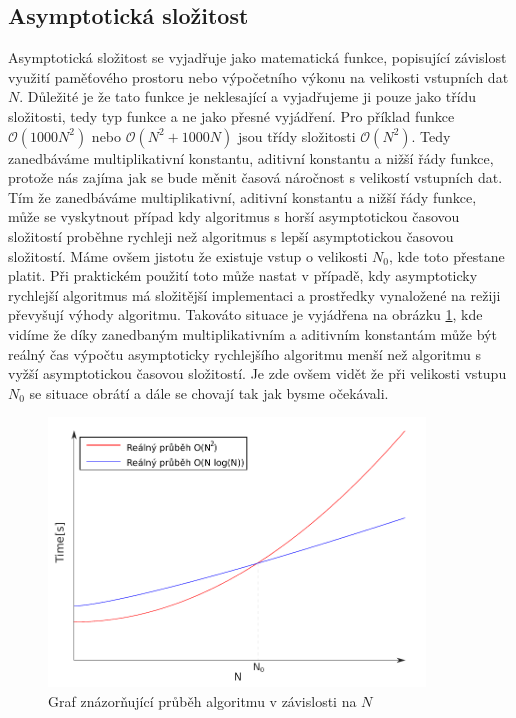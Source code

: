 \subsection{Asymptotická složitost}
	Asymptotická složitost se vyjadřuje jako matematická funkce, popisující závislost využití paměťového prostoru nebo výpočetního výkonu na velikosti vstupních dat $N$. Důležité je že tato funkce je neklesající a vyjadřujeme ji pouze jako třídu složitosti, tedy typ funkce a ne jako přesné vyjádření. Pro příklad funkce $\mathcal{O} (1000N^2) $ nebo $\mathcal{O} (N^2 + 1000N)$ jsou třídy složitosti $\mathcal{O} (N^2)$. Tedy zanedbáváme multiplikativní konstantu, aditivní konstantu a nižší řády funkce, protože nás zajíma jak se bude měnit časová náročnost s velikostí vstupních dat.
	Tím že zanedbáváme multiplikativní, aditivní konstantu a nižší řády funkce, může se vyskytnout případ kdy algoritmus s horší asymptotickou časovou složitostí proběhne rychleji než algoritmus s lepší asymptotickou časovou složitostí. Máme ovšem jistotu že existuje vstup o velikosti $N_0$, kde toto přestane platit. Při praktickém použití toto může nastat v případě, kdy asymptoticky rychlejší algoritmus má složitější implementaci a prostředky vynaložené na režiji převyšují výhody algoritmu. Takováto situace je vyjádřena na obrázku \ref{fig:4-time_complexity}, kde vidíme že díky zanedbaným multiplikativním a aditivním konstantám může být reálný čas výpočtu asymptoticky rychlejšího algoritmu menší než algoritmu s vyžší asymptotickou časovou složitostí. Je zde ovšem vidět že při velikosti vstupu $N_0$ se situace obrátí a dále se chovají tak jak bysme očekávali.\cite{hartmanis1965on}
	
\begin{figure}[h]
  \centering
  \includegraphics[width=10cm]{./pictures/4/time_complexity.pdf}
  \caption{Graf znázorňující průběh algoritmu v závislosti na $N$}
  \label{fig:4-time_complexity}
\end{figure}
	
